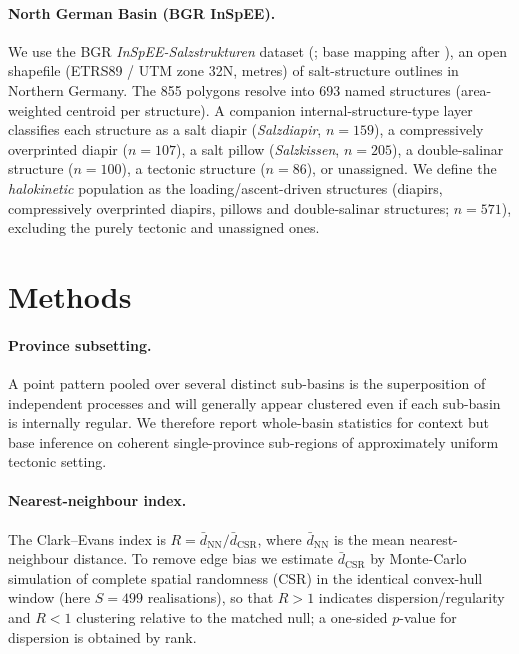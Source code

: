 \documentclass[11pt]{article}
\begin{document}
\paragraph{North German Basin (BGR InSpEE).}
We use the BGR \emph{InSpEE-Salzstrukturen} dataset (\citealp{bgr}; base mapping after
\citealp{reinhold2008}), an open shapefile (ETRS89 / UTM zone 32N, metres) of salt-structure outlines in
Northern Germany. The 855 polygons resolve into 693 named structures (area-weighted centroid per structure).
A companion internal-structure-type layer classifies each structure as a salt diapir
(\textit{Salzdiapir}, $n=159$), a compressively overprinted diapir ($n=107$), a salt pillow
(\textit{Salzkissen}, $n=205$), a double-salinar structure ($n=100$), a tectonic structure ($n=86$), or
unassigned. We define the \emph{halokinetic} population as the loading/ascent-driven structures (diapirs,
compressively overprinted diapirs, pillows and double-salinar structures; $n=571$), excluding the purely
tectonic and unassigned ones.

\section{Methods}
\paragraph{Province subsetting.}
A point pattern pooled over several distinct sub-basins is the superposition of independent processes and
will generally appear clustered even if each sub-basin is internally regular. We therefore report whole-basin
statistics for context but base inference on coherent single-province sub-regions of approximately uniform
tectonic setting.

\paragraph{Nearest-neighbour index.}
The Clark--Evans index \citep{clark1954} is $R=\bar d_{\mathrm{NN}}/\bar d_{\mathrm{CSR}}$, where
$\bar d_{\mathrm{NN}}$ is the mean nearest-neighbour distance. To remove edge bias we estimate
$\bar d_{\mathrm{CSR}}$ by Monte-Carlo simulation of complete spatial randomness (CSR) in the identical
convex-hull window (here $S=499$ realisations), so that $R>1$ indicates dispersion/regularity and $R<1$
clustering relative to the matched null; a one-sided $p$-value for dispersion is obtained by rank.
\end{document}
